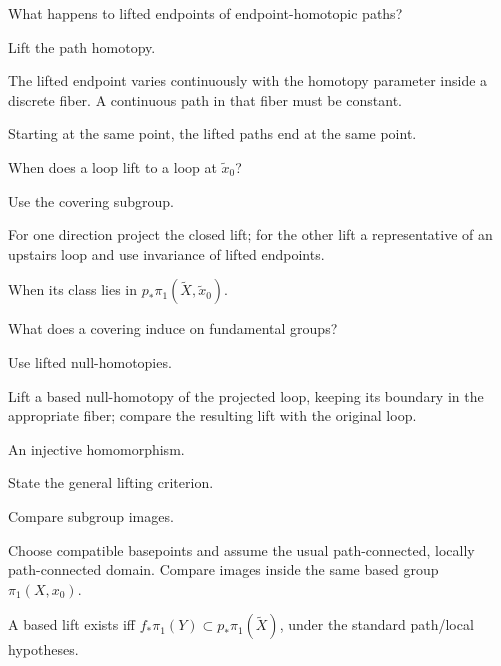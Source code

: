 \begin{exercise}\label{exr:viii11-07}
What happens to lifted endpoints of endpoint-homotopic paths?
\end{exercise}
\begin{hint}
Lift the path homotopy.

The lifted endpoint varies continuously with the homotopy parameter inside a discrete fiber. A continuous path in that fiber must be constant.
\end{hint}
\begin{solution}
Starting at the same point, the lifted paths end at the same point.
\end{solution}

\begin{exercise}\label{exr:viii11-08}
When does a loop lift to a loop at \(\tilde x_0\)?
\end{exercise}
\begin{hint}
Use the covering subgroup.

For one direction project the closed lift; for the other lift a representative of an upstairs loop and use invariance of lifted endpoints.
\end{hint}
\begin{solution}
When its class lies in \(p_*\pi_1(\widetilde X,\tilde x_0)\).
\end{solution}

\begin{exercise}\label{exr:viii11-09}
What does a covering induce on fundamental groups?
\end{exercise}
\begin{hint}
Use lifted null-homotopies.

Lift a based null-homotopy of the projected loop, keeping its boundary in the appropriate fiber; compare the resulting lift with the original loop.
\end{hint}
\begin{solution}
An injective homomorphism.
\end{solution}

\begin{exercise}\label{exr:viii11-10}
State the general lifting criterion.
\end{exercise}
\begin{hint}
Compare subgroup images.

Choose compatible basepoints and assume the usual path-connected, locally path-connected domain. Compare images inside the same based group \(\pi_1(X,x_0)\).
\end{hint}
\begin{solution}
A based lift exists iff \(f_*\pi_1(Y)\subset p_*\pi_1(\widetilde X)\), under the standard path/local hypotheses.
\end{solution}

